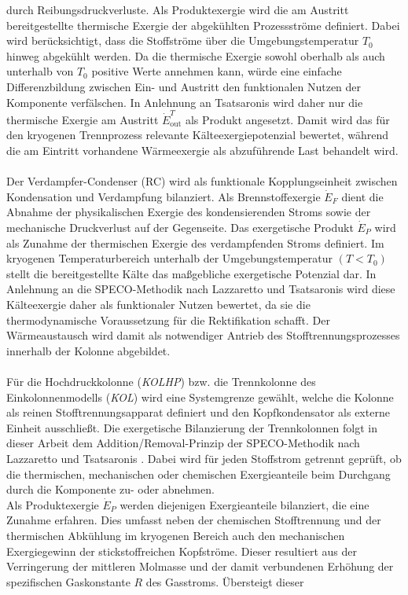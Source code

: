 durch Reibungsdruckverluste. Als Produktexergie wird die am Austritt bereitgestellte thermische Exergie der abgekühlten Prozessströme definiert. Dabei wird berücksichtigt, dass die Stoffströme über die Umgebungstemperatur
$T_0$ hinweg abgekühlt werden. Da die thermische Exergie sowohl oberhalb als
auch unterhalb von $T_0$ positive Werte annehmen kann, würde eine einfache
Differenzbildung zwischen Ein- und Austritt den funktionalen Nutzen der
Komponente verfälschen. In Anlehnung an Tsatsaronis \cite{lazzaretto2006speco} wird daher nur die
thermische Exergie am Austritt $\dot{E}^T_\mathrm{out}$ als Produkt angesetzt.
Damit wird das für den kryogenen Trennprozess relevante Kälteexergiepotenzial
bewertet, während die am Eintritt vorhandene Wärmeexergie als abzuführende Last
behandelt wird.\\
\\
Der Verdampfer-Condenser (RC) wird als funktionale Kopplungseinheit zwischen
Kondensation und Verdampfung bilanziert. Als Brennstoffexergie
\(\dot{E}_F\) dient die Abnahme der physikalischen Exergie des kondensierenden
Stroms sowie der mechanische Druckverlust auf der Gegenseite. Das exergetische
Produkt \(\dot{E}_P\) wird als Zunahme der thermischen Exergie des
verdampfenden Stroms definiert. Im kryogenen Temperaturbereich unterhalb der Umgebungstemperatur
\((T<T_0)\) stellt die bereitgestellte Kälte das maßgebliche exergetische
Potenzial dar. In Anlehnung an die SPECO-Methodik nach Lazzaretto und
Tsatsaronis wird diese Kälteexergie daher als funktionaler Nutzen bewertet, da
sie die thermodynamische Voraussetzung für die Rektifikation schafft. Der
Wärmeaustausch wird damit als notwendiger Antrieb des Stofftrennungsprozesses
innerhalb der Kolonne abgebildet.\\
\\
Für die Hochdruckkolonne (\textit{KOLHP}) bzw. die Trennkolonne des Einkolonnenmodells (\textit{KOL}) wird eine Systemgrenze gewählt, welche die Kolonne als reinen Stofftrennungsapparat definiert und den Kopfkondensator als externe Einheit ausschließt. Die exergetische Bilanzierung der Trennkolonnen folgt in dieser Arbeit dem Addition/Removal-Prinzip der SPECO-Methodik nach Lazzaretto und Tsatsaronis \cite{lazzaretto_speco_2006}. Dabei wird für jeden Stoffstrom getrennt geprüft, ob die thermischen, mechanischen oder chemischen Exergieanteile beim Durchgang durch die Komponente zu- oder abnehmen.\\
Als Produktexergie \(\dot{E}_P\) werden diejenigen Exergieanteile bilanziert, die eine Zunahme erfahren. Dies umfasst neben der chemischen Stofftrennung und der thermischen Abkühlung im kryogenen Bereich auch den mechanischen Exergiegewinn der stickstoffreichen Kopfströme. Dieser resultiert aus der Verringerung der mittleren Molmasse und der damit verbundenen Erhöhung der spezifischen Gaskonstante \(R\) des Gasstroms. Übersteigt dieser
